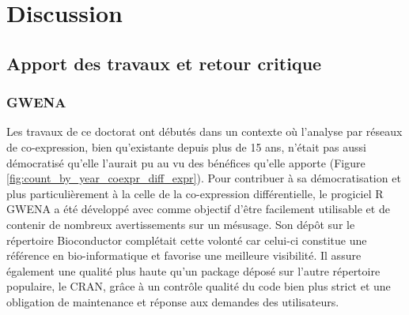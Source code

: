 \setcounter{chapter}{5}
\setcounter{section}{0}
\setcounter{figure}{0}   
\chapter*{Discussion}         %

\section{Apport des travaux et retour critique}

\subsection{GWENA}

Les travaux de ce doctorat ont débutés dans un contexte où l'analyse par réseaux de co-expression, bien qu'existante depuis plus de 15 ans, n'était pas aussi démocratisé qu'elle l'aurait pu au vu des bénéfices qu'elle apporte (Figure \ref{fig:count_by_year_coexpr_diff_expr}). Pour contribuer à sa démocratisation et plus particulièrement à la celle de la co-expression différentielle, le progiciel R GWENA a été développé avec comme objectif d'être facilement utilisable et de contenir de nombreux avertissements sur un mésusage. Son dépôt sur le répertoire Bioconductor complétait cette volonté car celui-ci constitue une référence en bio-informatique et favorise une meilleure visibilité. Il assure également une qualité plus haute qu'un package déposé sur l'autre répertoire populaire, le CRAN, grâce à un contrôle qualité du code bien plus strict et une obligation de maintenance et réponse aux demandes des utilisateurs.


